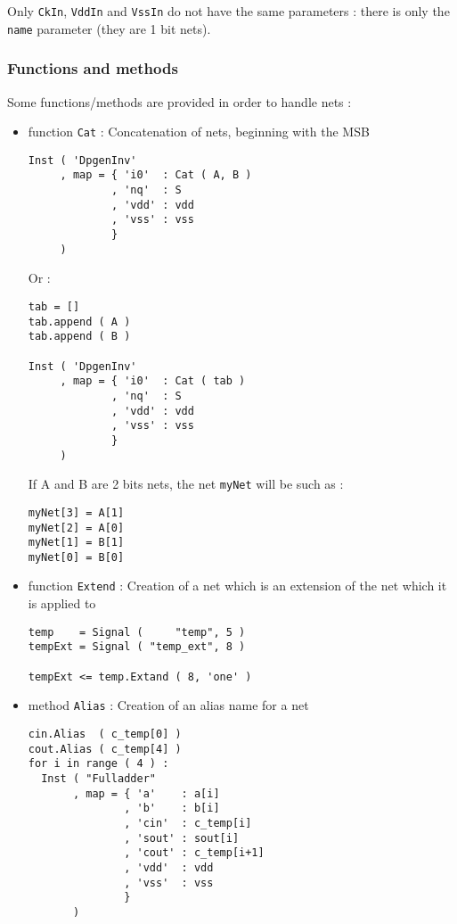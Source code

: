 \indent Only \verb-CkIn-, \verb-VddIn- and \verb-VssIn- do not have the same parameters : there is only the \verb-name- parameter (they are 1 bit nets).
    
\subsubsection{Functions and methods}

Some functions/methods are provided in order to handle nets :
\begin{itemize}
    \item function \verb-Cat- : Concatenation of nets, beginning with the MSB
\begin{verbatim}
Inst ( 'DpgenInv'
     , map = { 'i0'  : Cat ( A, B )
             , 'nq'  : S
             , 'vdd' : vdd
             , 'vss' : vss
             }
     )
\end{verbatim}
\indent Or :
\begin{verbatim}
tab = []
tab.append ( A )
tab.append ( B )

Inst ( 'DpgenInv'
     , map = { 'i0'  : Cat ( tab )
             , 'nq'  : S
             , 'vdd' : vdd
             , 'vss' : vss
             }
     )
\end{verbatim}
\indent If A and B are 2 bits nets, the net \verb-myNet- will be such as :
\begin{verbatim}
myNet[3] = A[1]
myNet[2] = A[0]
myNet[1] = B[1]
myNet[0] = B[0]
\end{verbatim}
    \item function \verb-Extend- : Creation of a net which is an extension of the net which it is applied to
\begin{verbatim}
temp    = Signal (     "temp", 5 )
tempExt = Signal ( "temp_ext", 8 )

tempExt <= temp.Extand ( 8, 'one' )
\end{verbatim}
    \item method \verb-Alias- : Creation of an alias name for a net
\begin{verbatim}
cin.Alias  ( c_temp[0] )
cout.Alias ( c_temp[4] )
for i in range ( 4 ) :
  Inst ( "Fulladder"
       , map = { 'a'    : a[i]
               , 'b'    : b[i]
               , 'cin'  : c_temp[i]
               , 'sout' : sout[i]
               , 'cout' : c_temp[i+1]
               , 'vdd'  : vdd
               , 'vss'  : vss
               }
       )    
\end{verbatim}
\end{itemize}


